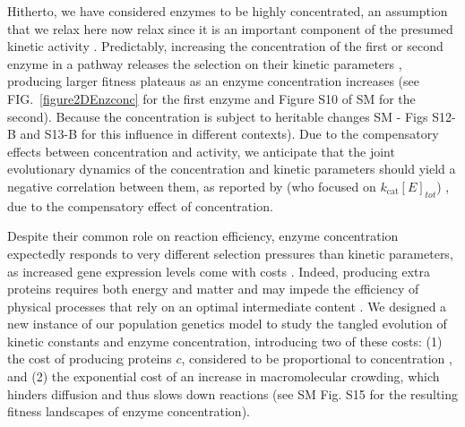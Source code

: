 \documentclass[11pt,onecolumn]{article}
\providecommand{\DIFadd}[1]{{\protect\color{blue} \sf #1}} %
\providecommand{\DIFdel}[1]{{\protect\color{red} \scriptsize #1}} %
\providecommand{\DIFaddbegin}{} %
\providecommand{\DIFaddend}{} %
\providecommand{\DIFdelbegin}{} %
\providecommand{\DIFdelend}{} %
\begin{document}
Hitherto, we have considered enzymes to be highly concentrated, an assumption that we \DIFdelbegin \DIFdel{relax here}\DIFdelend \DIFaddbegin \DIFadd{now relax since it is an important component of the presumed kinetic activity \citep{Koshland02}}\DIFaddend . Predictably, increasing the concentration of the first or second enzyme in a pathway releases the selection on their kinetic parameters \citep{Noor16}, producing larger fitness plateaus as an enzyme concentration increases (see \DIFdelbegin \DIFdel{FIG.~\ref{figure2DEnzconc} for the first enzyme and Figure S10 of SM for the second). Because the concentration is subject to heritable changes \citep{Schaefke13}}\DIFdelend \DIFaddbegin \DIFadd{SM - Figs S12-B and S13-B for this influence in different contexts). Due to the compensatory effects between concentration and activity}\DIFaddend , we anticipate that the joint evolutionary dynamics of the concentration and kinetic parameters should yield a negative correlation between them, as reported by \citet{Davidi16,Davidi18}\DIFdelbegin \DIFdel{(who focused on $k_\text{cat}[E]_{tot}$) , due to the compensatory effect of concentration}\DIFdelend . 

\DIFaddbegin \DIFadd{Despite their common role on reaction efficiency, enzyme concentration expectedly responds to very different selection pressures than kinetic parameters, as increased gene expression levels come with costs \citep{Wagner05,Lang09,ScottM10,Noor16,Kafri16}. Indeed, producing extra proteins requires both energy and matter \citep{Novick57,Stoebel08,Wagner05,Lynch15} and may impede the efficiency of physical processes that rely on an optimal intermediate content \citep{Dong95,Dill11,Andrews20}. We designed a new instance of our population genetics model to study the tangled evolution of kinetic constants and enzyme concentration, introducing two of these costs: (1) the cost of producing proteins $c$, considered to be proportional to concentration \citep{Wagner05,Chou14,Lynch15}, and (2) the exponential cost of an increase in macromolecular crowding, which hinders diffusion and thus slows down reactions \citep{Dill11,Schavemaker18,Andrews20} 
(see SM Fig. S15 for the resulting fitness landscapes of enzyme concentration).
}
\end{document}
